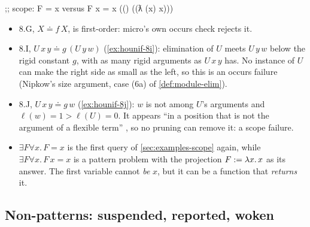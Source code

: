 {\begin{answers}
;; scope: F = x versus F x = x
(() ((ƛ (x) x)))
\end{answers}
\begin{itemize}
  \item 8.G, $X\doteq f\,X$, is first-order: micro's own occurs check rejects it.
  \item 8.I, $U\,x\,y\doteq g\,(U\,y\,w)$ (\cref{ex:hounif-8i}): elimination of $U$ meets $U\,y\,w$
    below the rigid constant $g$, with as many rigid arguments as $U\,x\,y$ has. No instance of $U$ can
    make the right side as small as the left, so this is an occurs failure (Nipkow's size argument,
    case (6a) of \cref{def:module-elim}).
  \item 8.J, $U\,x\,y\doteq g\,w$ (\cref{ex:hounif-8j}): $w$ is not among $U$'s arguments and
    $\ell(w)=1>\ell(U)=0$. It appears \enquote{in a position that is not the argument of a flexible
    term} , so no pruning can remove it: a scope failure.
  \item $\exists F\forall x.\,F=x$ is the first query of \cref{sec:examples-scope} again, while
    $\exists F\forall x.\,F\,x=x$ is a pattern problem with the projection $F:=\lambda x.\,x$ as its
    answer. The first variable cannot \emph{be} $x$, but it can be a function that \emph{returns}
    it.
\end{itemize}

\subsection{Non-patterns: suspended, reported, woken}\label{sec:examples-nonpattern}

}
